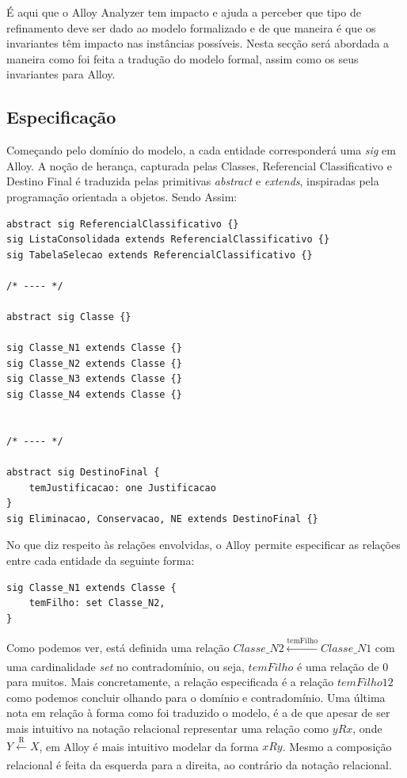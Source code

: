 \documentclass[tikz,runningheads,a4paper]{llncs}
\begin{document}
É aqui que o Alloy Analyzer tem impacto e ajuda a perceber que tipo de refinamento deve ser dado ao modelo formalizado e de que maneira é que os invariantes têm impacto nas instâncias possíveis. Nesta secção será abordada a maneira como foi feita a tradução do modelo formal, assim como os seus invariantes para Alloy.

\subsection{Especificação}

Começando pelo domínio do modelo, a cada entidade corresponderá uma \textit{sig} em Alloy. A noção de herança, capturada pelas Classes, Referencial Classificativo e Destino Final é traduzida pelas primitivas \textit{abstract} e \textit{extends}, inspiradas pela programação orientada a objetos. Sendo Assim:

\begin{verbatim}
abstract sig ReferencialClassificativo {}
sig ListaConsolidada extends ReferencialClassificativo {}
sig TabelaSelecao extends ReferencialClassificativo {}

/* ---- */

abstract sig Classe {}

sig Classe_N1 extends Classe {}
sig Classe_N2 extends Classe {}
sig Classe_N3 extends Classe {}
sig Classe_N4 extends Classe {}


/* ---- */

abstract sig DestinoFinal {
    temJustificacao: one Justificacao
}
sig Eliminacao, Conservacao, NE extends DestinoFinal {}
\end{verbatim}{}

No que diz respeito às relações envolvidas, o Alloy permite especificar as relações entre cada entidade da seguinte forma:

\begin{verbatim}
sig Classe_N1 extends Classe {
    temFilho: set Classe_N2,
}
\end{verbatim}{}

Como podemos ver, está definida uma relação $Classe\_N2 \xleftarrow[]{\text{temFilho}} Classe\_N1$ com uma cardinalidade \textit{set} no contradomínio, ou seja, $temFilho$ é uma relação de 0 para muitos. Mais concretamente, a relação especificada é a relação $temFilho12$ como podemos concluir olhando para o domínio e contradomínio. Uma última nota em relação à forma como foi traduzido o modelo, é a de que apesar de ser mais intuitivo na notação relacional representar uma relação como $y R x$, onde $Y \xleftarrow[]{\text{R}} X$, em Alloy é mais intuitivo modelar da forma $x R y$. Mesmo a composição relacional é feita da esquerda para a direita, ao contrário da notação relacional.
\end{document}
